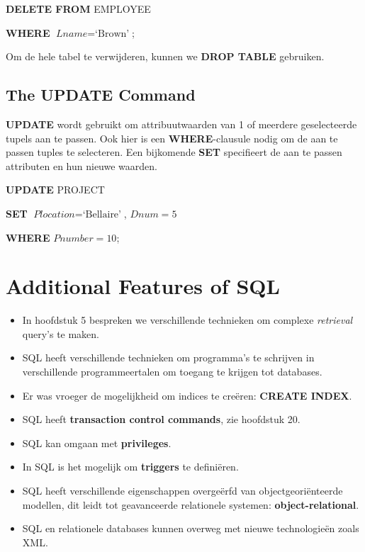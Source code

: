 \vspace{1mm}\hspace{10mm}
\textbf{DELETE FROM} EMPLOYEE

\hspace{10mm}
\textbf{WHERE} $\textit{Lname} = \text{`Brown'}$;
\vspace{3mm}

\noindent Om de hele tabel te verwijderen, kunnen we \textbf{DROP TABLE} gebruiken.


\subsection{The UPDATE Command}
\textbf{UPDATE} wordt gebruikt om attribuutwaarden van 1 of meerdere geselecteerde tupels aan te passen. Ook hier is een \textbf{WHERE}-clausule nodig om de aan te passen tuples te selecteren. Een bijkomende \textbf{SET} specifieert de aan te passen attributen en hun nieuwe waarden.

\vspace{1mm}\hspace{10mm}
\textbf{UPDATE} PROJECT

\hspace{10mm}
\textbf{SET} $\textit{Plocation} = \text{`Bellaire'}$, $\textit{Dnum} = 5$

\hspace{10mm}
\textbf{WHERE} $\textit{Pnumber} = 10$;


\section{Additional Features of SQL}
\begin{itemize}
\item In hoofdstuk 5 bespreken we verschillende technieken om complexe \textit{retrieval} query's te maken.
\item SQL heeft verschillende technieken om programma's te schrijven in verschillende programmeertalen om toegang te krijgen tot databases.
\item Er was vroeger de mogelijkheid om indices te cre\"eren: \textbf{CREATE INDEX}.
\item SQL heeft \textbf{transaction control commands}, zie hoofdstuk 20.
\item SQL kan omgaan met \textbf{privileges}.
\item In SQL is het mogelijk om \textbf{triggers} te defini\"eren.
\item SQL heeft verschillende eigenschappen overge\"erfd van objectgeori\"enteerde modellen, dit leidt tot geavanceerde relationele systemen: \textbf{object-relational}.
\item SQL en relationele databases kunnen overweg met nieuwe technologie\"en zoals XML.
\end{itemize}